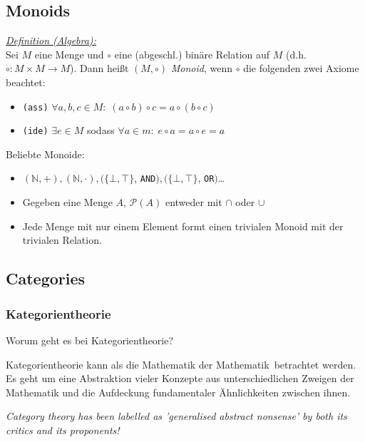 \documentclass{beamer}
\begin{document}
\subsection*{Monoids}

\begin{frame}
\underline{\emph{Definition (Algebra):}}\\ Sei $M$ eine Menge und $\circ$ eine (abgeschl.) binäre Relation auf $M$ (d.h. $\circ : M \times M \to M$). Dann heißt $(M, \circ)$ \emph{Monoid}, wenn $\circ$ die folgenden zwei Axiome beachtet:

\begin{itemize}
\pause \item \texttt{(ass)} $\forall a,b,c \in M:\; (a \circ b) \circ c = a \circ (b \circ c)$
\pause \item \texttt{(ide)} $\exists e \in M$ sodass $\forall a \in m:\; e \circ a = a \circ e = a$
\end{itemize}
\pause\bigskip

Beliebte Monoide:
\begin{itemize}
\pause \item $(\mathbb{N}, +), (\mathbb{N}, \cdot), (\{\bot, \top\}$, \texttt{AND}$), (\{\bot, \top\}$, \texttt{OR}$)$\dots
\pause \item Gegeben eine Menge $A$, $\mathcal{P}(A)$ entweder mit $\cap$ oder $\cup$
\pause \item Jede Menge mit nur einem Element formt einen trivialen Monoid mit der trivialen Relation.
\end{itemize}

\end{frame}

\subsection*{Categories}

\begin{frame}
\frametitle{Kategorientheorie}

Worum geht es bei Kategorientheorie?
\pause\bigskip

Kategorientheorie kann als die \glqq Mathematik der Mathematik\grqq\ betrachtet werden. Es geht um eine
Abstraktion vieler Konzepte aus unterschiedlichen Zweigen der Mathematik und die Aufdeckung fundamentaler
Ähnlichkeiten zwischen ihnen.
\pause\bigskip

\textit{\glqq Category theory has been labelled as 'generalised abstract nonsense' by both its critics and 
its proponents!\grqq}
\end{frame}
\end{document}
